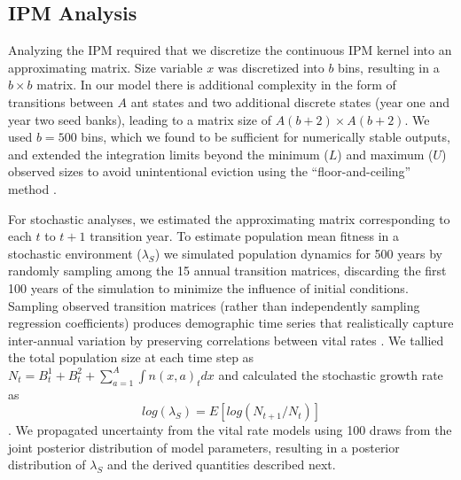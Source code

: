 \documentclass[11pt]{article}
\begin{document}
\subsection*{IPM Analysis}
Analyzing the IPM required that we discretize the continuous IPM kernel into an approximating matrix. 
Size variable $x$ was discretized into $b$ bins, resulting in a $b \times b$ matrix.
In our model there is additional complexity in the form of transitions between $A$ ant states and two additional discrete states (year one and year two seed banks), leading to a matrix size of $A(b+2) \times A(b+2)$.
We used $b = 500$ bins, which we found to be sufficient for numerically stable outputs, and extended the integration limits beyond the minimum ($L$) and maximum ($U$) observed sizes to avoid unintentional eviction using the ``floor-and-ceiling'' method \citep{Williams2012}. 

For stochastic analyses, we estimated the approximating matrix corresponding to each $t$ to $t+1$ transition year. 
To estimate population mean fitness in a stochastic environment ($\lambda_{S}$) we simulated population dynamics for 500 years by randomly sampling among the 15 annual transition matrices, discarding the first 100 years of the simulation to minimize the influence of initial conditions. 
Sampling observed transition matrices (rather than independently sampling regression coefficients) produces demographic time series that realistically capture inter-annual variation by preserving correlations between vital rates \citep{metcalf2015statistical}.
We tallied the total population size at each time step as  $N_{t} = B^1_{t} + B^2_{t} + \sum_{a=1}^{A}\int n(x,a)_{t}dx$ and calculated the stochastic growth rate as 
$$log(\lambda_S) = E[log(N_{t+1} / N_t)]$$ \citep{Rees2009}.
We propagated uncertainty from the vital rate models using 100 draws from the joint posterior distribution of model parameters, resulting in a posterior distribution of $\lambda_{S}$ and the derived quantities described next.
\end{document}
